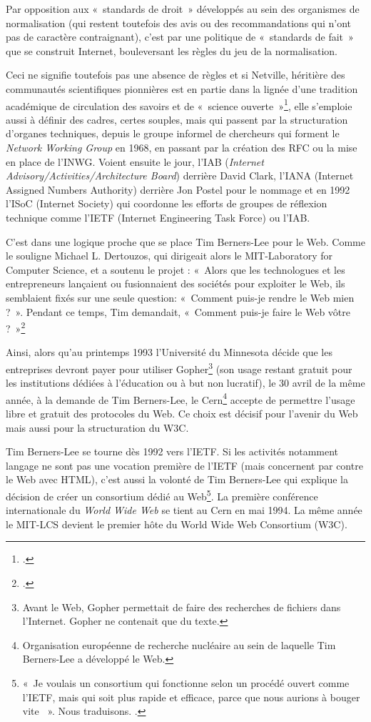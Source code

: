 \documentclass{FramateX}
\begin{document}
\begin{refsection}
Par opposition aux «~standards de droit~» développés au sein des organismes de normalisation (qui restent toutefois des avis ou des recommandations qui n'ont pas de caractère
contraignant), c'est par une politique de «~standards
de fait~» que se construit Internet, bouleversant les règles du jeu de la normalisation.

Ceci ne signifie toutefois pas une absence de règles et si Netville,
héritière des communautés scientifiques pionnières est en partie dans
la lignée d'une tradition académique de circulation
des savoirs et de «~science ouverte~»\footnote{\cite{King1997}.},
elle s'emploie aussi à définir des cadres, certes
souples, mais qui passent par la structuration
d'organes techniques, depuis le groupe informel de
chercheurs qui forment le \textit{Network Working Group} en 1968, en
passant par la création des RFC ou la mise en place de
l'INWG. Voient ensuite le jour, l'IAB
(\textit{Internet Advisory/Activities/Architecture Board}) derrière
David Clark, l'IANA (Internet Assigned Numbers
Authority) derrière Jon Postel pour le nommage et en 1992
l'ISoC (Internet Society) qui
coordonne les efforts de groupes de réflexion technique comme
l'IETF (Internet Engineering Task Force) ou
l'IAB.


C'est dans une logique proche que se place Tim
Berners-Lee pour le Web. Comme le souligne Michael L. Dertouzos, qui
dirigeait alors le MIT-Laboratory for Computer Science, et a
soutenu le projet : «~Alors que les technologues et les entrepreneurs
lançaient ou fusionnaient des sociétés pour exploiter le Web, ils
semblaient fixés sur une seule question: «~Comment puis-je rendre le
Web mien ?~». Pendant ce temps, Tim demandait, «~Comment puis-je faire le Web vôtre ?~»\footnote{\cite[p.~viii]{berners-leeweaving2000}.}

Ainsi, alors qu'au printemps 1993
l'Université du Minnesota décide que les entreprises
devront payer pour utiliser Gopher\footnote{Avant le Web, Gopher
permettait de faire des recherches de fichiers dans
l'Internet. Gopher ne contenait que du texte.} (son
usage restant gratuit pour les institutions dédiées à
l'éducation ou à but non lucratif), le 30 avril de la
même année, à la demande de Tim Berners-Lee, le
Cern\footnote{Organisation européenne de recherche nucléaire au sein de
laquelle Tim Berners-Lee a développé le Web.} accepte de permettre
l'usage libre et gratuit des protocoles du Web. Ce
choix est décisif pour l'avenir du Web mais aussi pour
la structuration du W3C. 

Tim Berners-Lee se tourne dès 1992 vers l'IETF. Si les activités notamment
langage ne sont pas une vocation première de l'IETF
(mais concernent par contre le Web avec HTML), c'est
aussi la volonté de Tim Berners-Lee qui explique la décision de créer
un consortium dédié au Web\footnote{«~Je voulais un
consortium qui fonctionne selon un procédé ouvert comme
l'IETF, mais qui soit plus rapide et efficace, parce
que nous aurions à bouger vite ~». Nous traduisons. \cite[p.~92]{berners-leeweaving2000}.}. La première
conférence internationale du \textit{World Wide Web} se tient au Cern
en mai 1994. La même année le MIT-LCS devient le premier hôte du World Wide Web Consortium (W3C). 


\end{refsection}
\end{document}
